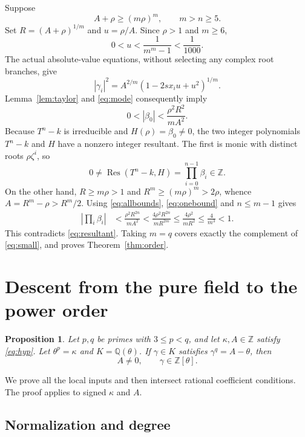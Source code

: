 \documentclass[11pt,letterpaper]{article}
\newtheorem{proposition}[theorem]{Proposition}
\theoremstyle{remark}\newtheorem{remark}[theorem]{Remark}
\newcommand{\Q}{\mathbb Q}
\newcommand{\Z}{\mathbb Z}
\newcommand{\Res}{\operatorname{Res}}
\begin{document}
Suppose
\begin{equation}\label{eq:large}
                        A+\rho\ge(m\rho)^m,
                  \qquad m>n\ge5.
\end{equation}
Set $R=(A+\rho)^{1/m}$ and $u=\rho/A$.
Since $\rho>1$ and $m\ge6$,
\[
                 0<u<\frac1{m^m-1}<\frac1{1000}.
\]
The actual absolute-value equations, without selecting any complex root
branches, give
\[
 |\gamma_i|^2=A^{2/m}(1-2sx_i u+u^2)^{1/m}.
\]
Lemma~\ref{lem:taylor} and \eqref{eq:mode} consequently imply
\begin{equation}\label{eq:onebound}
                0<|\beta_0|<\frac{\rho^2 R^2}{mA^2}.
\end{equation}
Because $T^n-k$ is irreducible and $H(\rho)=\beta_0\ne0$, the two integer
polynomials $T^n-k$ and $H$ have a nonzero integer resultant. The first is
monic with distinct roots $\rho\zeta^i$, so
\begin{equation}\label{eq:resultant}
           0\ne\Res(T^n-k,H)=\prod_{i=0}^{n-1}\beta_i\in\Z.
\end{equation}
On the other hand, $R\ge m\rho>1$ and
$R^m\ge(m\rho)^m>2\rho$, whence $A=R^m-\rho>R^m/2$.
Using \eqref{eq:allbounds}, \eqref{eq:onebound} and $n\le m-1$ gives
\begin{align*}
 \left|\prod_i\beta_i\right|
 &<\frac{\rho^2R^{2n}}{mA^2}
 <\frac{4\rho^2R^{2n}}{mR^{2m}}
 \le\frac{4\rho^2}{mR^2}
 \le\frac4{m^3}<1.
\end{align*}
This contradicts \eqref{eq:resultant}. Taking $m=q$ covers exactly the
complement of \eqref{eq:small}, and proves Theorem~\ref{thm:order}.

\section{Descent from the pure field to the power order}\label{sec:local}

\begin{proposition}\label{prop:descent}
Let $p,q$ be primes with $3\le p<q$, and let $\kappa,A\in\Z$ satisfy
\eqref{eq:hyp}. Let $\theta^p=\kappa$ and $K=\Q(\theta)$.
If $\gamma\in K$ satisfies $\gamma^q=A-\theta$, then
\[
                   A\ne0,\qquad \gamma\in\Z[\theta].
\]
\end{proposition}

We prove all the local inputs and then intersect rational coefficient
conditions. The proof applies to signed $\kappa$ and $A$.

\subsection{Normalization and degree}
\end{document}
